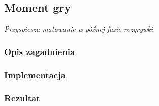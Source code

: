 \subsection{Moment gry}
\label{subsec:moment-gry}
\textit{Przyspiesza matowanie w późnej fazie rozgrywki.}


\subsubsection{Opis zagadnienia}
\subsubsection{Implementacja}
\subsubsection{Rezultat}